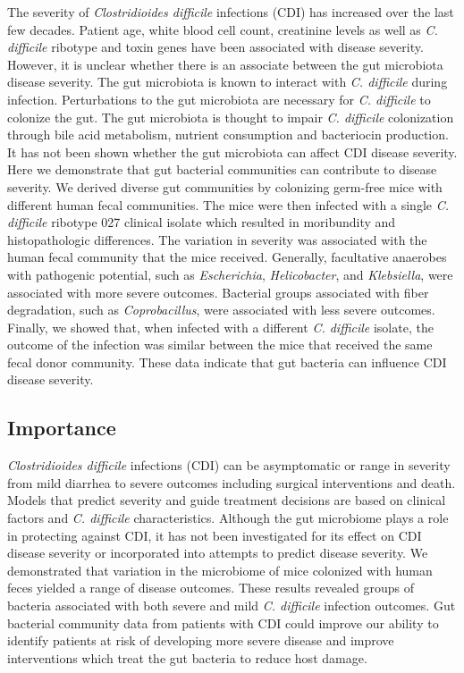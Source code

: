 \documentclass[
  12pt,
]{article}
\begin{document}
The severity of \emph{Clostridioides difficile} infections (CDI) has
increased over the last few decades. Patient age, white blood cell
count, creatinine levels as well as \emph{C. difficile} ribotype and
toxin genes have been associated with disease severity. However, it is
unclear whether there is an associate between the gut microbiota disease
severity. The gut microbiota is known to interact with \emph{C.
difficile} during infection. Perturbations to the gut microbiota are
necessary for \emph{C. difficile} to colonize the gut. The gut
microbiota is thought to impair \emph{C. difficile} colonization through
bile acid metabolism, nutrient consumption and bacteriocin production.
It has not been shown whether the gut microbiota can affect CDI disease
severity. Here we demonstrate that gut bacterial communities can
contribute to disease severity. We derived diverse gut communities by
colonizing germ-free mice with different human fecal communities. The
mice were then infected with a single \emph{C. difficile} ribotype 027
clinical isolate which resulted in moribundity and histopathologic
differences. The variation in severity was associated with the human
fecal community that the mice received. Generally, facultative anaerobes
with pathogenic potential, such as \emph{Escherichia},
\emph{Helicobacter}, and \emph{Klebsiella}, were associated with more
severe outcomes. Bacterial groups associated with fiber degradation,
such as \emph{Coprobacillus}, were associated with less severe outcomes.
Finally, we showed that, when infected with a different \emph{C.
difficile} isolate, the outcome of the infection was similar between the
mice that received the same fecal donor community. These data indicate
that gut bacteria can influence CDI disease severity.

\hypertarget{importance}{%
\subsection{Importance}\label{importance}}

\emph{Clostridioides difficile} infections (CDI) can be asymptomatic or
range in severity from mild diarrhea to severe outcomes including
surgical interventions and death. Models that predict severity and guide
treatment decisions are based on clinical factors and \emph{C.
difficile} characteristics. Although the gut microbiome plays a role in
protecting against CDI, it has not been investigated for its effect on
CDI disease severity or incorporated into attempts to predict disease
severity. We demonstrated that variation in the microbiome of mice
colonized with human feces yielded a range of disease outcomes. These
results revealed groups of bacteria associated with both severe and mild
\emph{C. difficile} infection outcomes. Gut bacterial community data
from patients with CDI could improve our ability to identify patients at
risk of developing more severe disease and improve interventions which
treat the gut bacteria to reduce host damage.
\end{document}
